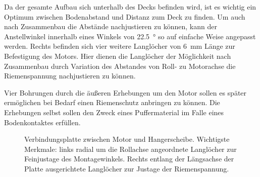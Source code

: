		Da der gesamte Aufbau sich unterhalb des Decks befinden wird, ist es wichtig ein Optimum zwischen Bodenabstand und Distanz zum Deck zu finden.
		Um auch nach Zusammenbau die Abstände nachjustieren zu können, kann der Anstellwinkel innerhalb eines Winkels von \qty{22,5}{\degree} so auf einfache Weise angepasst werden.
		Rechts befinden sich vier weitere Langlöcher von \qty{6}{\milli\metre} Länge zur Befestigung des Motors.
		Hier dienen die Langlöcher der Möglichkeit nach Zusammenbau durch Variation des Abstandes von Roll- zu Motorachse die Riemenspannung nachjustieren zu können.\par
		Vier Bohrungen durch die äußeren Erhebungen um den Motor sollen es später ermöglichen bei Bedarf einen Riemenschutz anbringen zu können.
		Die Erhebungen selbst sollen den Zweck eines Puffermaterial im Falle eines Bodenkontaktes erfüllen.

		\begin{figure}[h]
			\centering
			
			\caption[Verbindungsplatte zwischen Motor und Hangerscheibe]{Verbindungsplatte zwischen Motor und Hangerscheibe. Wichtigste Merkmale: links radial um die Rollachse angeordnete Langlöcher zur Feinjustage des Montagewinkels. Rechts entlang der Längsachse der Platte ausgerichtete Langlöcher zur Justage der Riemenspannung.}
			\label{fig:motor piece drawing}
		\end{figure}
